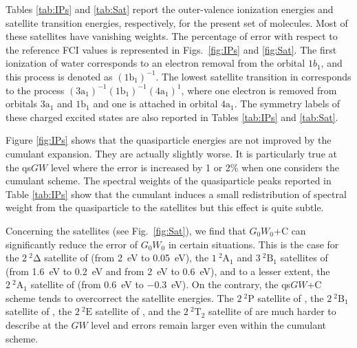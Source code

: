\documentclass[aip,jcp,reprint,noshowkeys,superscriptaddress]{revtex4-2}
\begin{document}
Tables \ref{tab:IPs} and \ref{tab:Sat} report the outer-valence ionization energies and satellite transition energies, respectively, for the present set of molecules. 
Most of these satellites have vanishing weights.
The percentage of error with respect to the reference FCI values is represented in Figs.~\ref{fig:IPs} and \ref{fig:Sat}.
The first ionization of water corresponds to an electron removal from the orbital $1b_1$, and this process is denoted as $(1\mathrm{b}_1)^{-1}$.
The lowest satellite transition in  corresponds to the process $(3\mathrm{a}_1)^{-1}(1\mathrm{b}_1)^{-1}(4\mathrm{a}_1)^1$, where one electron is removed from orbitals $3\mathrm{a}_1$ and $1\mathrm{b}_1$ and one is attached in orbital $4\mathrm{a}_1$. The symmetry labels of these charged excited states are also reported in Tables \ref{tab:IPs} and \ref{tab:Sat}.

Figure \ref{fig:IPs} shows that the quasiparticle energies are not improved by the cumulant expansion. They are actually slightly worse. It is particularly true at the qs$GW$ level where the error is increased by 1 or 2\% when one considers the cumulant scheme. 
The spectral weights of the quasiparticle peaks reported in Table \ref{tab:IPs} show that the cumulant induces a small redistribution of spectral weight from the quasiparticle to the satellites but this effect is quite subtle.

Concerning the satellites (see Fig.~\ref{fig:Sat}), we find that $G_0W_0$+C can significantly reduce the error of $G_0W_0$ in certain situations. This is the case for the $2~^{2}\mathrm{\Delta}$ satellite of  (from \SI{2}{\eV} to \SI{0.05}{\eV}), the $1~^{2}\mathrm{A}_1$ and $3~^{2}\mathrm{B}_1$ satellites of  (from \SI{1.6}{\eV} to \SI{0.2}{\eV} and from \SI{2}{\eV} to \SI{0.6}{\eV}), and to a lesser extent, the $2~^{2}\mathrm{A}_1$ satellite of  (from \SI{0.6}{\eV} to \SI{-0.3}{\eV}). On the contrary, the qs$GW$+C scheme tends to overcorrect the satellite energies.
The $2~^{2}\mathrm{P}$ satellite of , the $2~^{2}\mathrm{B}_1$ satellite of , the $2~^{2}\mathrm{E}$ satellite of , and the $2~^{2}\mathrm{T}_2$ satellite of  are much harder to describe at the $GW$ level and errors remain larger even within the cumulant scheme.

\end{document}
